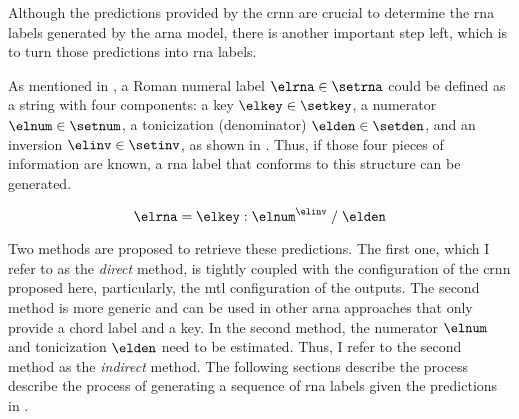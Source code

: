
Although the predictions provided by the \gls{crnn} are
crucial to determine the \gls{rna} labels generated by the
\gls{arna} model, there is another important step left,
which is to turn those predictions into \gls{rna} labels.

As mentioned in
, a Roman
numeral label $\elrna \in \setrna$ could be defined as a
string with four components: a key $\elkey \in \setkey$, a
numerator $\elnum \in \setnum$, a tonicization (denominator)
$\elden \in \setden$, and an inversion $\elinv \in \setinv$,
as shown in . Thus, if those four pieces of
information are known, a \gls{rna} label that conforms to
this structure can be generated.

\begin{equation}
    \label{eq:rna}
    \elrna = \elkey : \elnum^{\elinv} \; / \; \elden
\end{equation}

Two methods are proposed to retrieve these predictions. The
first one, which I refer to as the \emph{direct} method, is
tightly coupled with the configuration of the \gls{crnn}
proposed here, particularly, the \gls{mtl} configuration of
the outputs. The second method is more generic and can be
used in other \gls{arna} approaches that only provide a
chord label and a key. In the second method, the numerator
$\elnum$ and tonicization $\elden$ need to be estimated.
Thus, I refer to the second method as the \emph{indirect}
method. The following sections describe the process describe
the process of generating a sequence of \gls{rna} labels
given the predictions in .




